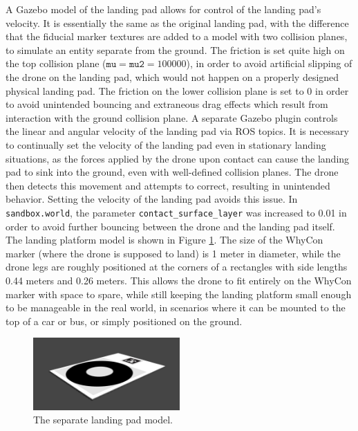 A Gazebo model of the landing pad allows for control of the landing pad's velocity. It is essentially the same as the original landing pad, with the difference that the fiducial marker textures are added to a model with two collision planes, to simulate an entity separate from the ground. The friction is set quite high on the top collision plane ($\texttt{mu} = \texttt{mu2} = 100000$), in order to avoid artificial slipping of the drone on the landing pad, which would not happen on a properly designed physical landing pad. The friction on the lower collision plane is set to 0 in order to avoid unintended bouncing and extraneous drag effects which result from interaction with the ground collision plane. A separate Gazebo plugin controls the linear and angular velocity of the landing pad via ROS topics. It is necessary to continually set the velocity of the landing pad even in stationary landing situations, as the forces applied by the drone upon contact can cause the landing pad to sink into the ground, even with well-defined collision planes. The drone then detects this movement and attempts to correct, resulting in unintended behavior. Setting the velocity of the landing pad avoids this issue. In \texttt{sandbox.world}, the parameter \texttt{contact\_surface\_layer} was increased to 0.01 in order to avoid further bouncing between the drone and the landing pad itself. The landing platform model is shown in Figure \ref{fig:landing_pad_model}. The size of the WhyCon marker (where the drone is supposed to land) is 1 meter in diameter, while the drone legs are roughly positioned at the corners of a rectangles with side lengths 0.44 meters and 0.26 meters. This allows the drone to fit entirely on the WhyCon marker with space to spare, while still keeping the landing platform small enough to be manageable in the real world, in scenarios where it can be mounted to the top of a car or bus, or simply positioned on the ground.

\begin{figure}
    \centering
    \includegraphics[width=0.5\textwidth]{images/landing_pad_model.png}
    \caption{The separate landing pad model.}
    \label{fig:landing_pad_model}
\end{figure}

